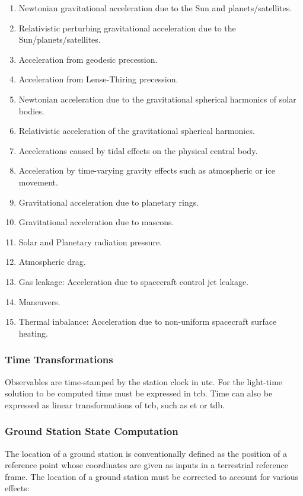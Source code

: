 \documentclass{article}
\theoremstyle{mystyle}
\begin{document}
\begin{enumerate}[itemsep=0pt]
\item Newtonian gravitational acceleration due to the Sun and planets/satellites.
\item Relativistic perturbing gravitational acceleration due to the Sun/planets/satellites.
\item Acceleration from geodesic precession.
\item Acceleration from Lense-Thiring precession.
\item Newtonian acceleration due to the gravitational spherical harmonics of solar bodies.
\item Relativistic acceleration of the gravitational spherical harmonics.
\item Accelerations caused by tidal effects on the physical central body.
\item Acceleration by time-varying gravity effects such as atmospheric or ice movement.
\item Gravitational acceleration due to planetary rings.
\item Gravitational acceleration due to mascons.
\item Solar and Planetary radiation pressure.
\item Atmospheric drag.
\item Gas leakage: Acceleration due to spacecraft control jet leakage.
\item Maneuvers.
\item Thermal inbalance: Acceleration due to non-uniform spacecraft surface heating.
\end{enumerate}

\subsubsection{\footnotesize Time Transformations}

\noindent Observables are time-stamped by the station clock in \gls{utc}. For the light-time solution to be computed time must be expressed in \gls{tcb}. Time can also be expressed as linear transformations of \gls{tcb}, such as \gls{et} or \gls{tdb}.

\subsubsection{\footnotesize Ground Station State Computation}

The location of a ground station is conventionally defined as the position of a reference point whose coordinates are given as inputs in a terrestrial reference frame. The location of a ground station must be corrected to account for various effects:
\end{document}
